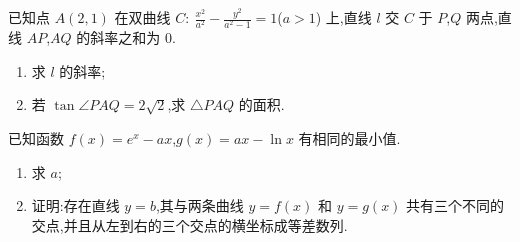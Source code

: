 \begin{problem}
已知点 \(A(2,1)\) 在双曲线 \(C:\ \frac{x^2}{a^2}-\frac{y^2}{a^2-1}=1\)(\(a>1\)) 上,直线 \(l\) 交 \(C\) 于 \(P\),\(Q\) 两点,直线 \(AP\),\(AQ\) 的斜率之和为 \(0\).

\begin{enumerate}
\item 求 \(l\) 的斜率;

\item 若 \(\tan \angle PAQ=2\sqrt2\),求 \(\triangle PAQ\) 的面积.
\end{enumerate}
\end{problem}

\begin{problem}
已知函数 \(f(x)=e^x-ax\),\(g(x)=ax-\ln x\) 有相同的最小值.

\begin{enumerate}
\item 求 \(a\);

\item 证明:存在直线 \(y=b\),其与两条曲线 \(y=f(x)\) 和 \(y=g(x)\) 共有三个不同的交点,并且从左到右的三个交点的横坐标成等差数列.
\end{enumerate}
\end{problem}


